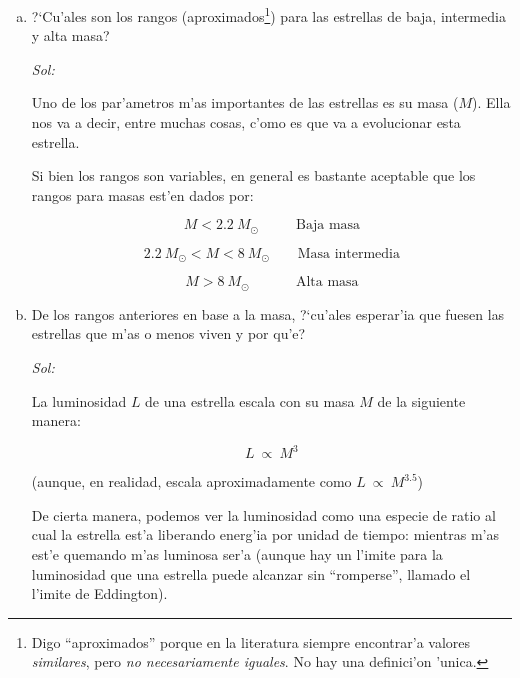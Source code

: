 \documentclass{article}
\begin{document}
\begin{enumerate}[a)]
\item ?`Cu'ales son los rangos (aproximados\footnote{Digo ``aproximados'' porque en la literatura siempre encontrar'a valores \emph{similares}, pero \emph{no necesariamente iguales}. No hay una definici'on 'unica.}) para las estrellas de baja, intermedia y alta masa?

\vspace{2mm}
\emph{Sol:}
\vspace{2mm}

Uno de los par'ametros m'as importantes de las estrellas es su masa ($M$). Ella nos va a decir, entre muchas cosas, c'omo es que va a evolucionar esta estrella.

Si bien los rangos son variables, en general es bastante aceptable que los rangos para masas est'en dados por:

\begin{equation*}
M < 2.2 \ M_\odot \ \ \ \ \ \ \ \ \ \ \ \ \text{Baja masa}
\end{equation*}

\begin{equation*}
 2.2 \ M_\odot < M < 8 \ M_\odot \ \ \ \ \ \ \ \ \ \text{Masa intermedia}
\end{equation*}

\begin{equation*}
M > 8 \ M_\odot \ \ \ \ \ \ \ \ \ \ \ \ \ \ \ \text{Alta masa}
\end{equation*}



\item De los rangos anteriores en base a la masa, ?`cu'ales esperar'ia que fuesen las estrellas que m'as o menos viven y por qu'e?

\vspace{2mm}
\emph{Sol:}
\vspace{2mm}

La luminosidad $L$ de una estrella escala con su masa $M$ de la siguiente manera:

\begin{equation}
L \ \propto \ M^{3}
\end{equation}

(aunque, en realidad, escala aproximadamente como $L \ \propto \ M^{3.5}$)

De cierta manera, podemos ver la luminosidad como una especie de ratio al cual la estrella est'a liberando energ'ia por unidad de tiempo: mientras m'as est'e quemando m'as luminosa ser'a (aunque hay un l'imite para la luminosidad que una estrella puede alcanzar sin ``romperse'', llamado el l'imite de Eddington).


\end{enumerate}
\end{document}
